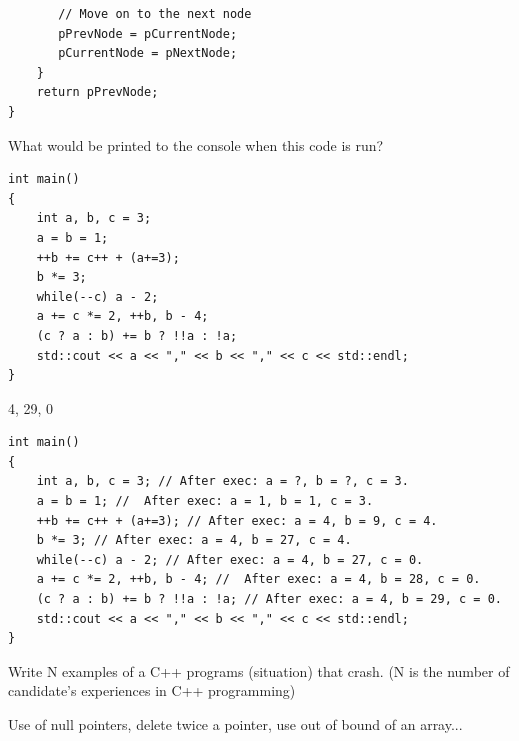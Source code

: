 \documentclass{exam}%
\newcommand*{\ANCOAMATH}{}%
\begin{document}
\begin{questions}
\begin{solution}[.2in]
\begin{lstlisting}
       // Move on to the next node
       pPrevNode = pCurrentNode;
       pCurrentNode = pNextNode;
    }
    return pPrevNode;
}
\end{lstlisting}
\end{solution}

\question What would be printed to the console when this code is run?
\begin{lstlisting}
int main()
{
    int a, b, c = 3;
    a = b = 1;
    ++b += c++ + (a+=3);
    b *= 3;
    while(--c) a - 2;
    a += c *= 2, ++b, b - 4;
    (c ? a : b) += b ? !!a : !a;
    std::cout << a << "," << b << "," << c << std::endl;
}
\end{lstlisting}
\begin{solution}[.2in]
4, 29, 0
\begin{lstlisting}
int main()
{
    int a, b, c = 3; // After exec: a = ?, b = ?, c = 3.
    a = b = 1; //  After exec: a = 1, b = 1, c = 3.
    ++b += c++ + (a+=3); // After exec: a = 4, b = 9, c = 4.
    b *= 3; // After exec: a = 4, b = 27, c = 4.
    while(--c) a - 2; // After exec: a = 4, b = 27, c = 0.
    a += c *= 2, ++b, b - 4; //  After exec: a = 4, b = 28, c = 0.
    (c ? a : b) += b ? !!a : !a; // After exec: a = 4, b = 29, c = 0.
    std::cout << a << "," << b << "," << c << std::endl;
}
\end{lstlisting}
\end{solution}

\question Write N examples of a C++ programs (situation) that crash. (N is the number of candidate's experiences in C++ programming)
\begin{solution}[.2in]
	Use of null pointers, delete twice a pointer, use out of bound of an array...
\end{solution}

\end{questions}
\fi
\ifdefined\ANCOAMATH
\newpage
\end{document}
